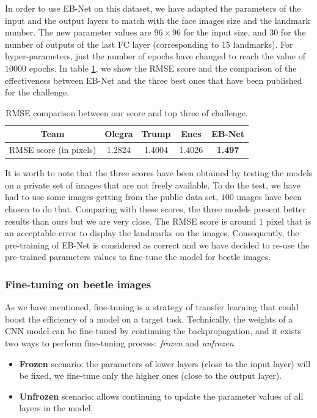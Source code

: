 \documentclass[review]{elsarticle}
\begin{document}
In order to use EB-Net on this dataset, we have adapted the parameters of the input and the output layers to match with the face images size and the landmark number. The new parameter values are $96 \times 96$ for the input size, and $30$ for the number of outputs of the last FC layer (corresponding to $15$ landmarks). For hyper-parameters, just the number of epochs have changed to reach the value of $10000$ epochs. In table \ref{tblRMSE_challenge}, we show the RMSE score and the comparison of the effectiveness between EB-Net and the three best ones that have been published for the challenge.

\begin{table}[h!]
	\centering
	\begin{tabular}{ | c | c | c | c | c |}
	\hline
	Team & Olegra & Trump & Enes & EB-Net \\ \hline
	RMSE score (in pixels) & 1.2824 & 1.4004 & 1.4026 & \textbf{1.497} \\ \hline
\end{tabular}	
	\caption{RMSE comparison between our score and top three of challenge.}
	\label{tblRMSE_challenge}
\end{table}

It is worth to note that the three scores have been obtained by testing the models on a private set of images that are not freely available. To do the test, we have had to use some images getting from the public data set, $100$ images have been chosen to do that. Comparing with these scores, the three models present better results than ours but we are very close. The RMSE score is around $1$ pixel that is an acceptable error to display the landmarks on the images. Consequently, the pre-training of EB-Net is considered as correct and we have decided to re-use the pre-trained parameters values to fine-tune the model for beetle images.

\subsubsection{Fine-tuning on beetle images}
As we have mentioned, fine-tuning is a strategy of transfer learning that could boost the efficiency of a model on a target task. Technically, the weights of a CNN model can be fine-tuned by continuing the backpropagation, and it exists two ways to perform fine-tuning process: \textit{frozen} and \textit{unfrozen}.
\begin{itemize}
	\item \textbf{Frozen} scenario: the parameters of lower layers (close to the input layer) will be fixed, we fine-tune only the higher ones (close to the output layer).
	\item \textbf{Unfrozen} scenario: allows continuing to update the parameter values of all layers in the model.
\end{itemize}
\end{document}
